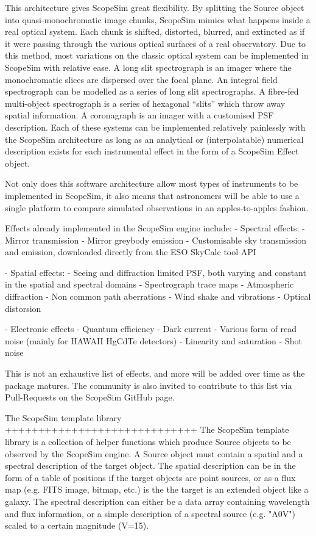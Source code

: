 This architecture gives ScopeSim great flexibility. By splitting the Source
object into quasi-monochromatic image chunks, ScopeSim mimics what happens
inside a real optical system. Each chunk is shifted, distorted, blurred, and
extincted as if it were passing through the various optical surfaces
of a real observatory. Due to this method, most variations on the classic
optical system can be implemented in ScopeSim with relative ease. A long slit
spectrograph is an imager where the monochromatic slices are dispersed
over the focal plane. An integral field spectrograph can be modelled as a series
of long slit spectrographs. A fibre-fed multi-object spectrograph is a series of
hexagonal ``slits'' which throw away spatial information. A coronagraph is an
imager with a customised PSF description. Each of these systems can be
implemented relatively painlessly with the ScopeSim architecture as long as an
analytical or (interpolatable) numerical description exists for each
instrumental effect in the form of a ScopeSim Effect object.

Not only does this software architecture allow most types of instruments to be
implemented in ScopeSim, it also means that astronomers will be able to use a
single platform to compare simulated observations in an apples-to-apples
fashion.

Effects already implemented in the ScopeSim engine include:
- Spectral effects:
    - Mirror transmission
    - Mirror greybody emission
    - Customisable sky transmission and emission, downloaded directly from the
      ESO SkyCalc tool API

- Spatial effects:
    - Seeing and diffraction limited PSF, both varying and constant in the
      spatial and spectral domains
    - Spectrograph trace maps
    - Atmospheric diffraction
    - Non common path aberrations
    - Wind shake and vibrations
    - Optical distorsion

- Electronic effects
    - Quantum efficiency
    - Dark current
    - Various form of read noise (mainly for HAWAII HgCdTe detectors)
    - Linearity and saturation
    - Shot noise

This is not an exhaustive list of effects, and more will be added over time as
the package matures. The community is also invited to contribute to this list
via Pull-Requests on the ScopeSim GitHub page.


The ScopeSim template library
+++++++++++++++++++++++++++++
The ScopeSim template library is a collection of helper functions which produce
Source objects to be observed by the ScopeSim engine. A Source object must
contain a spatial and a spectral description of the target object. The spatial
description can be in the form of a table of positions if the target objects are
point sources, or as a flux map (e.g. FITS image, bitmap, etc.) is the the
target is an extended object like a galaxy. The spectral description can either
be a data array containing wavelength and flux information, or a simple
description of a spectral source (e.g. "A0V") scaled to a certain magnitude
(V=15).

